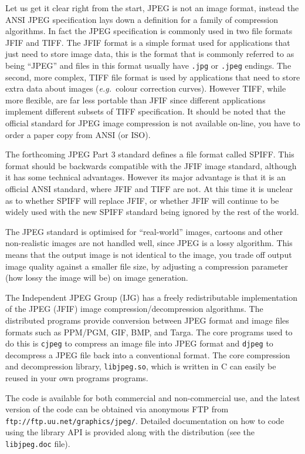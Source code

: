 \documentclass[twoside,11pt]{article}
\newcommand{\htmladdnormallink}[2]{#1}
\begin{document}
Let us get it clear right from the start, JPEG is not an image format, instead the ANSI JPEG specification lays down a definition for a family of compression algorithms. In fact the JPEG specification is commonly used in two file formats JFIF and TIFF. The JFIF format is a simple format used for applications that just need to store image data, this is the format that is commonly referred to as being ``JPEG'' and files in this format usually have {\tt .jpg} or {\tt .jpeg} endings. The second, more complex, TIFF file format is used by applications that need to store extra data about images ({\em e.g.\ }colour correction curves). However TIFF, while more flexible, are far less portable than JFIF since different applications implement different subsets of TIFF specification. It should be noted that the official standard for JPEG image compression is not available on-line, you have to order a paper copy from ANSI (or ISO).

The forthcoming JPEG Part 3 standard defines a file format called SPIFF. This format should be backwards compatible with the JFIF image standard, although it has some technical advantages. However its major advantage is that it is an official ANSI standard, where JFIF and TIFF are not. At this time it is unclear as to whether SPIFF will replace JFIF, or whether JFIF will continue to be widely used with the new SPIFF standard being ignored by the rest of the world.

The JPEG standard is optimised for ``real-world'' images, cartoons and other non-realistic images are not handled well, since JPEG is a lossy algorithm. This means that the output image is not identical to the image, you trade off output image quality against a smaller file size, by adjusting a compression parameter (how lossy the image will be) on image generation.

The Independent JPEG Group (IJG) has a freely redistributable implementation of the JPEG (JFIF) image compression/decompression algorithms. The distributed programs provide conversion between JPEG format and image files formats such as PPM/PGM, GIF, BMP, and Targa. The core programs used to do this is {\tt cjpeg} to compress an image file into JPEG format and {\tt djpeg} to decompress a JPEG file back into a conventional format. The core compression and decompression library, {\tt libjpeg.so}, which is written in C can easily be reused in your own programs programs.

The code is available for both commercial and non-commercial use, and the latest version of the code can be obtained via anonymous FTP from  \htmladdnormallink{{\tt ftp://ftp.uu.net/graphics/jpeg/}}{ftp://ftp.uu.net/graphics/jpeg/}. Detailed documentation on how to code using the library API is provided along with the distribution (see the {\tt libjpeg.doc} file). 
\end{document}
